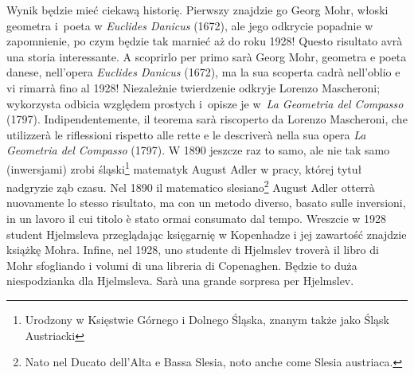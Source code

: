Wynik będzie mieć ciekawą historię. %
Pierwszy znajdzie go Georg Mohr, włoski geometra i~poeta w \emph{Euclides Danicus} (1672), ale jego odkrycie popadnie w zapomnienie, po czym będzie tak marnieć aż do roku 1928! %
Questo risultato avrà una storia interessante. %
A scoprirlo per primo sarà Georg Mohr, geometra e poeta danese, nell'opera \emph{Euclides Danicus} (1672), ma la sua scoperta cadrà nell'oblio e vi rimarrà fino al 1928! %
%
Niezależnie twierdzenie odkryje Lorenzo Mascheroni; wykorzysta odbicia względem prostych i~opisze je w~\emph{La Geometria del Compasso} (1797). %
Indipendentemente, il teorema sarà riscoperto da Lorenzo Mascheroni, che utilizzerà le riflessioni rispetto alle rette e le descriverà nella sua opera \emph{La Geometria del Compasso} (1797). %
%
W 1890 jeszcze raz to samo, ale nie tak samo (inwersjami) zrobi śląski\footnote{Urodzony w Księstwie Górnego i Dolnego Śląska, znanym także jako Śląsk Austriacki} matematyk August Adler w pracy, której tytuł nadgryzie ząb czasu. %
Nel 1890 il matematico slesiano\footnote{Nato nel Ducato dell'Alta e Bassa Slesia, noto anche come Slesia austriaca.} August Adler otterrà nuovamente lo stesso risultato, ma con un metodo diverso, basato sulle inversioni, in un lavoro il cui titolo è stato ormai consumato dal tempo. %
Wreszcie w 1928 student Hjelmsleva przeglądając księgarnię w Kopenhadze i jej zawartość znajdzie książkę Mohra. %
Infine, nel 1928, uno studente di Hjelmslev troverà il libro di Mohr sfogliando i volumi di una libreria di Copenaghen. %
Będzie to duża niespodzianka dla Hjelmsleva. %
Sarà una grande sorpresa per Hjelmslev. %

